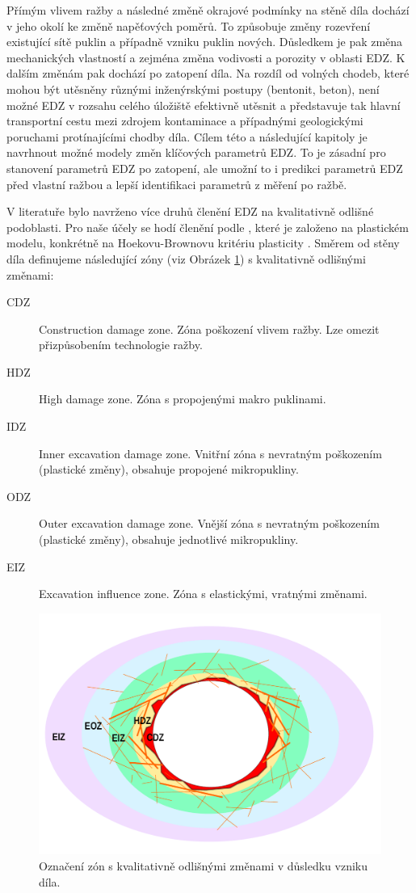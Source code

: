 \documentclass{article}
\begin{document}
Přímým vlivem ražby a následné změně okrajové podmínky na stěně díla dochází v jeho okolí ke změně napěťových poměrů. To způsobuje změny rozevření 
existující sítě puklin a případně vzniku puklin nových. Důsledkem je pak změna mechanických vlastností a zejména změna vodivosti a 
porozity v oblasti EDZ. K dalším změnám pak dochází po zatopení díla. Na rozdíl od volných chodeb, které mohou být utěsněny různými inženýrskými postupy (bentonit, beton), není možné EDZ v rozsahu celého úložiště efektivně utěsnit a představuje tak hlavní transportní cestu mezi zdrojem kontaminace 
a případnými geologickými poruchami protínajícími chodby díla. 
Cílem této a následující kapitoly je navrhnout možné modely změn klíčových parametrů EDZ. To je zásadní pro stanovení parametrů EDZ po zatopení, ale
umožní to i predikci parametrů EDZ před vlastní ražbou a lepší identifikaci parametrů z měření po ražbě.

V literatuře bylo navrženo více druhů členění EDZ na kvalitativně odlišné podoblasti. Pro naše účely se hodí členění podle \cite{Perras2016}, 
které je založeno na plastickém modelu, konkrétně na Hoekovu-Brownovu kritériu plasticity \cite{Hoek2002}. Směrem od stěny díla definujeme následující zóny (viz Obrázek \ref{fig:edz_zones}) s kvalitativně odlišnými změnami:
\begin{description}
\item[CDZ] Construction damage zone. Zóna poškození vlivem ražby. Lze omezit přizpůsobením technologie ražby.
\item[HDZ] High damage zone. Zóna s propojenými makro puklinami. 
\item[IDZ] Inner excavation damage zone. Vnitřní zóna s nevratným poškozením (plastické změny), obsahuje propojené mikropukliny.
\item[ODZ] Outer excavation damage zone. Vnější zóna s nevratným poškozením (plastické změny), obsahuje jednotlivé mikropukliny.
\item[EIZ] Excavation influence zone. Zóna s elastickými, vratnými změnami.
\end{description}


\begin{figure}
    \centering
    \includegraphics[width=\textwidth]{graphics/EDZ_structure.pdf}
    \caption{Označení zón s kvalitativně odlišnými změnami v důsledku vzniku díla.}
    \label{fig:edz_zones}
\end{figure}
\end{document}
